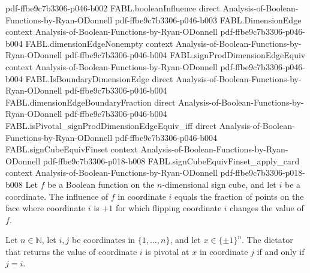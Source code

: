 \begin{theorem}
  {pdf-ffbe9c7b3306-p046-b002}
\proofstep
  {FABL.booleanInfluence}
  {direct}
  {Analysis-of-Boolean-Functions-by-Ryan-ODonnell}
  {pdf-ffbe9c7b3306-p046-b003}
\proofstep
  {FABL.DimensionEdge}
  {context}
  {Analysis-of-Boolean-Functions-by-Ryan-ODonnell}
  {pdf-ffbe9c7b3306-p046-b004}
\proofstep
  {FABL.dimensionEdgeNonempty}
  {context}
  {Analysis-of-Boolean-Functions-by-Ryan-ODonnell}
  {pdf-ffbe9c7b3306-p046-b004}
\proofstep
  {FABL.signProdDimensionEdgeEquiv}
  {context}
  {Analysis-of-Boolean-Functions-by-Ryan-ODonnell}
  {pdf-ffbe9c7b3306-p046-b004}
\proofstep
  {FABL.IsBoundaryDimensionEdge}
  {direct}
  {Analysis-of-Boolean-Functions-by-Ryan-ODonnell}
  {pdf-ffbe9c7b3306-p046-b004}
\proofstep
  {FABL.dimensionEdgeBoundaryFraction}
  {direct}
  {Analysis-of-Boolean-Functions-by-Ryan-ODonnell}
  {pdf-ffbe9c7b3306-p046-b004}
\proofstep
  {FABL.isPivotal_signProdDimensionEdgeEquiv_iff}
  {direct}
  {Analysis-of-Boolean-Functions-by-Ryan-ODonnell}
  {pdf-ffbe9c7b3306-p046-b004}
\proofstep
  {FABL.signCubeEquivFinset}
  {context}
  {Analysis-of-Boolean-Functions-by-Ryan-ODonnell}
  {pdf-ffbe9c7b3306-p018-b008}
\proofstep
  {FABL.signCubeEquivFinset_apply_card}
  {context}
  {Analysis-of-Boolean-Functions-by-Ryan-ODonnell}
  {pdf-ffbe9c7b3306-p018-b008}
Let $f$ be a Boolean function on the $n$-dimensional sign cube, and let $i$ be a
coordinate. The influence of $f$ in coordinate $i$ equals the fraction of points on the
face where coordinate $i$ is $+1$ for which flipping coordinate $i$ changes the value of
$f$.
\end{theorem}

\begin{theorem}
\label{FABL.isPivotal_dictator_iff}
\leanok
{}
Let $n\in\mathbb N$, let $i,j$ be coordinates in $\{1,\ldots,n\}$, and let
$x\in\{\pm1\}^n$. The dictator that returns the value of coordinate $i$ is pivotal at
$x$ in coordinate $j$ if and only if $j=i$.
\end{theorem}


